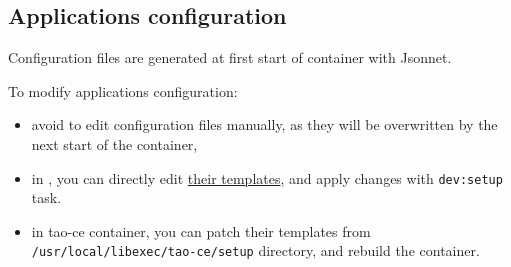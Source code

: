 \subsection{Applications configuration}
\begin{frame}
    Configuration files are generated at first start of container with \alert{Jsonnet}.


    To modify applications configuration:
    \begin{itemize}
        \item[\faBan] avoid to edit configuration files manually, as they will be overwritten by the next start of the container,
        \item[\faCheck] in \devcontainer, you can directly edit \href{https://github.com/tao-ce/tao-ce/tree/main/libexec/setup}{their templates}, and apply changes with \texttt{dev:setup} task.
        \item[\faCheck] in tao-ce container, you can patch their templates from \texttt{/usr/local/libexec/tao-ce/setup} directory, and rebuild the container.
    \end{itemize}
\end{frame}

